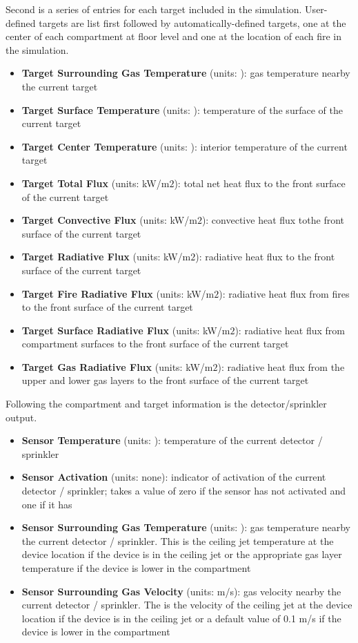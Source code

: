 Second is a series of entries for each target included in the simulation.  User-defined targets are list first followed by automatically-defined targets, one at the center of each compartment at floor level and one at the location of each fire in the simulation.

\begin{itemize}
\item \textbf{Target Surrounding Gas Temperature} (units: \degc): gas temperature nearby the current target
\item \textbf{Target Surface Temperature} (units: \degc): temperature of the surface of the current target
\item \textbf{Target Center Temperature} (units: \degc): interior temperature of the current target
\item \textbf{Target Total Flux} (units: kW/m$2$): total net heat flux to the front surface of the current target
\item \textbf{Target Convective Flux} (units: kW/m$2$): convective heat flux tothe  front surface of the current target
\item \textbf{Target Radiative Flux} (units: kW/m$2$): radiative heat flux to the front surface of the current target
\item \textbf{Target Fire Radiative Flux} (units: kW/m$2$): radiative heat flux from fires to the front surface of the current target
\item \textbf{Target Surface Radiative Flux} (units: kW/m$2$): radiative heat flux from compartment surfaces to the front surface of the current target
\item \textbf{Target Gas Radiative Flux} (units: kW/m$2$):   radiative heat flux from the upper and lower gas layers to the front surface of the current target
\end{itemize}

Following the compartment and target information is the detector/sprinkler output.

\begin{itemize}
\item \textbf{Sensor Temperature} (units: \degc): temperature of the current detector / sprinkler
\item \textbf{Sensor Activation} (units: none): indicator of activation of the current detector / sprinkler; takes a value of zero if the sensor has not activated and one if it has
\item \textbf{Sensor Surrounding Gas Temperature} (units: \degc): gas temperature nearby the current detector / sprinkler. This is the ceiling jet temperature at the device location if the device is in the ceiling jet or the appropriate gas layer temperature if the device is lower in the compartment
\item \textbf{Sensor Surrounding Gas Velocity} (units: m/s): gas velocity nearby the current detector / sprinkler. The is the velocity of the ceiling jet at the device location if the device is in the ceiling jet or a default value of 0.1 m/s if the device is lower in the compartment
\end{itemize}

